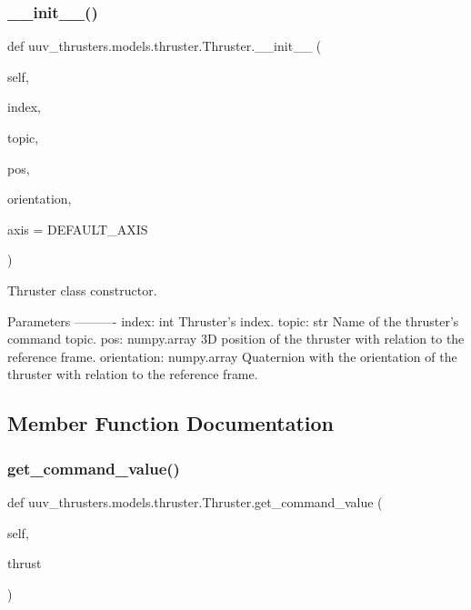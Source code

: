 \subsubsection{\texorpdfstring{\+\_\+\+\_\+init\+\_\+\+\_\+()}{\_\_init\_\_()}}
{\footnotesize\ttfamily def uuv\+\_\+thrusters.\+models.\+thruster.\+Thruster.\+\_\+\+\_\+init\+\_\+\+\_\+ (\begin{DoxyParamCaption}\item[{}]{self,  }\item[{}]{index,  }\item[{}]{topic,  }\item[{}]{pos,  }\item[{}]{orientation,  }\item[{}]{axis = {\ttfamily DEFAULT\+\_\+AXIS} }\end{DoxyParamCaption})}

\begin{DoxyVerb}Thruster class constructor.

Parameters
----------
index: int
    Thruster's index.
topic: str
    Name of the thruster's command topic.
pos: numpy.array
    3D position of the thruster with relation to the reference frame.
orientation: numpy.array
    Quaternion with the orientation of the thruster with relation to
    the reference frame.
\end{DoxyVerb}
 

\subsection{Member Function Documentation}
\mbox{\label{classuuv__thrusters_1_1models_1_1thruster_1_1Thruster_a822a77083f976afe5b370555e2cd5f0f}} 
\subsubsection{\texorpdfstring{get\+\_\+command\+\_\+value()}{get\_command\_value()}}
{\footnotesize\ttfamily def uuv\+\_\+thrusters.\+models.\+thruster.\+Thruster.\+get\+\_\+command\+\_\+value (\begin{DoxyParamCaption}\item[{}]{self,  }\item[{}]{thrust }\end{DoxyParamCaption})}

